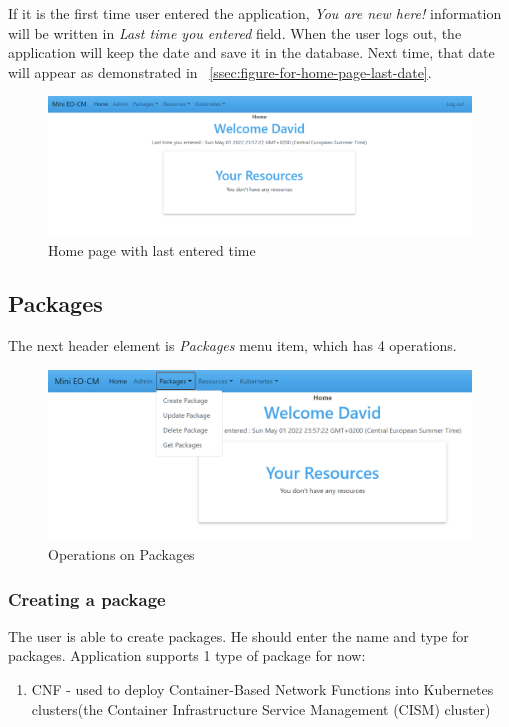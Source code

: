 If it is the first time user entered the application, \emph{You are new here!} information will be written in \emph{Last time you entered} field. When the user logs out, the application will keep the date and save it in the database. Next time, that date will appear as demonstrated in ~\autoref{ssec:figure-for-home-page-last-date}.

\begin{figure}[H]
	\centering
	\includegraphics[width=\textwidth]{images/main-2.png}
	\caption{Home page with last entered time}
    \label{ssec:figure-for-home-page-last-date}
\end{figure}

\subsection{Packages}

The next header element is \emph{Packages} menu item, which has 4 operations.

\begin{figure}[H]
	\centering
	\includegraphics[width=\textwidth]{images/packages-menu.png}
	\caption{Operations on Packages}
	\label{ssec:figure-operations-package}
\end{figure}

\subsubsection{Creating a package}
The user is able to create packages. He should enter the name and type for packages. Application supports 1 type of package for now:
\begin{enumerate}
    \item CNF - used to deploy Container-Based Network Functions into Kubernetes clusters(the Container Infrastructure Service Management (CISM) cluster)
\end{enumerate}

